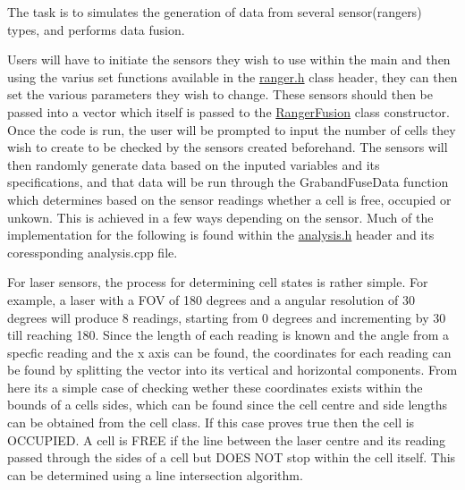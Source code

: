 The task is to simulates the generation of data from several sensor(rangers) types, and performs data fusion.

Users will have to initiate the sensors they wish to use within the main and then using the varius set functions available in the \hyperlink{ranger_8h_source}{ranger.\+h} class header, they can then set the various parameters they wish to change. These sensors should then be passed into a vector which itself is passed to the \hyperlink{classRangerFusion}{Ranger\+Fusion} class constructor. Once the code is run, the user will be prompted to input the number of cells they wish to create to be checked by the sensors created beforehand. The sensors will then randomly generate data based on the inputed variables and its specifications, and that data will be run through the Graband\+Fuse\+Data function which determines based on the sensor readings whether a cell is free, occupied or unkown. This is achieved in a few ways depending on the sensor. Much of the implementation for the following is found within the \hyperlink{analysis_8h}{analysis.\+h} header and its coressponding analysis.\+cpp file.

For laser sensors, the process for determining cell states is rather simple. For example, a laser with a F\+OV of 180 degrees and a angular resolution of 30 degrees will produce 8 readings, starting from 0 degrees and incrementing by 30 till reaching 180. Since the length of each reading is known and the angle from a specfic reading and the x axis can be found, the coordinates for each reading can be found by splitting the vector into its vertical and horizontal components. From here its a simple case of checking wether these coordinates exists within the bounds of a cells sides, which can be found since the cell centre and side lengths can be obtained from the cell class. If this case proves true then the cell is O\+C\+C\+U\+P\+I\+ED. A cell is F\+R\+EE if the line between the laser centre and its reading passed through the sides of a cell but D\+O\+ES N\+OT stop within the cell itself. This can be determined using a line intersection algorithm.

